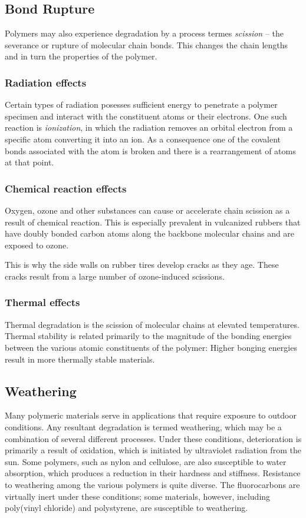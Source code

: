 \subsection{Bond Rupture}
Polymers may also experience degradation by a process termes \textit{scission} -- the severance or rupture of molecular chain bonds. This changes the chain lengths and in turn the properties of the polymer.


\subsubsection{Radiation effects}
Certain types of radiation posesses sufficient energy to penetrate a polymer specimen and interact with the constituent atoms or their electrons. One such reaction is \textit{ionization}, in which the radiation removes an orbital electron from a specific atom converting it into an ion. As a consequence one of the covalent bonds associated with the atom is broken and there is a rearrangement of atoms at that point.

\subsubsection{Chemical reaction effects}
Oxygen, ozone and other substances can cause or accelerate chain scission as a result of chemical reaction. This is especially prevalent in vulcanized rubbers that have doubly bonded carbon atoms along the backbone molecular chains and are exposed to ozone.

This is why the side walls on rubber tires develop cracks as they age. These cracks result from a large number of ozone-induced scissions. 

\subsubsection{Thermal effects}
Thermal degradation is the scission of molecular chains at elevated temperatures. Thermal stability is related primarily to the magnitude of the bonding energies between the various atomic constituents of the polymer: Higher bonging energies result in more thermally stable materials.

\subsection{Weathering}
Many polymeric materials serve in applications that require exposure to outdoor conditions. Any resultant degradation is termed weathering, which may be a combination of several different processes. Under these conditions, deterioration is primarily a result of oxidation, which is initiated by ultraviolet radiation from the sun. Some polymers, such as nylon and cellulose, are also susceptible to water absorption, which produces a reduction in their hardness and stiffness. Resistance to weathering among the various polymers is quite diverse. The fluorocarbons are virtually inert under these conditions; some materials, however, including poly(vinyl chloride) and polystyrene, are susceptible to weathering.
